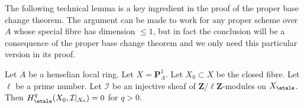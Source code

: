 \noindent
The following technical lemma is a key ingredient in the proof of
the proper base change theorem. The argument can be made to work
for any proper scheme over $A$ whose special fibre has dimension
$\leq 1$, but in fact the conclusion will be a consequence of the
proper base change theorem and we only need this particular version
in its proof.

\begin{lemma}
\label{lemma-efface-cohomology-on-fibre-by-finite-cover}
Let $A$ be a henselian local ring. Let $X = \mathbf{P}^1_A$.
Let $X_0 \subset X$ be the closed fibre. Let $\ell$ be a prime
number. Let $\mathcal{I}$ be an injective sheaf of
$\mathbf{Z}/\ell\mathbf{Z}$-modules on $X_\etale$. Then
$H^q_\etale(X_0, \mathcal{I}|_{X_0}) = 0$ for $q > 0$.
\end{lemma}

